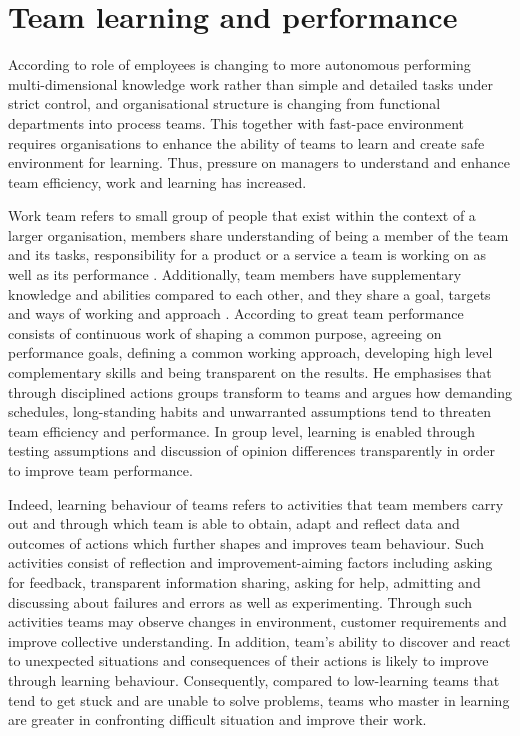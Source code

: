 \section{Team learning and performance} \label{teamperformance}
According to \citet{hammer1993reengineering} role of employees is changing to more autonomous performing multi-dimensional knowledge work rather than simple and detailed tasks under strict control, and organisational structure is changing from functional departments into process teams. This together with fast-pace environment requires organisations to enhance the ability of teams to learn and create safe environment for learning. Thus, pressure on managers to understand and enhance team efficiency, work and learning has increased. \citep{edmondson1999psychological}

Work team refers to small group of people that exist within the context of a larger organisation, members share understanding of being a member of the team and its tasks, responsibility for a product or a service a team is working on \citep{hackman1987design,alderfer1983intergroup} as well as its performance \citep{edmondson1999psychological}. Additionally, team members have supplementary knowledge and abilities compared to each other, and they share a goal, targets and ways of working and approach \citep{edmondson1999psychological}. According to \citet{katzenbach1993wisdom} great team performance consists of continuous work of shaping a common purpose, agreeing on performance goals, defining a common working approach, developing high level complementary skills and being transparent on the results. He emphasises that through disciplined actions groups transform to teams and argues how demanding schedules, long-standing habits and unwarranted assumptions tend to threaten team efficiency and performance\citep{katzenbach1993wisdom}. In group level, learning is enabled through testing assumptions and discussion of opinion differences transparently in order to improve team performance\citep{edmondson1999psychological}.

Indeed, learning behaviour of teams refers to activities that team members carry out and through which team is able to obtain, adapt and reflect data and outcomes of actions which further shapes and improves team behaviour. Such activities consist of reflection and improvement-aiming factors including asking for feedback, transparent information sharing, asking for help, admitting and discussing about failures and errors as well as experimenting. Through such activities teams may observe changes in environment, customer requirements and improve collective understanding. In addition, team's ability to discover and react to unexpected situations and consequences of their actions is likely to improve through learning behaviour. Consequently, compared to low-learning teams that tend to get stuck and are unable to solve problems, teams who master in learning are greater in confronting difficult situation and improve their work. \citep{edmondson1999psychological}


